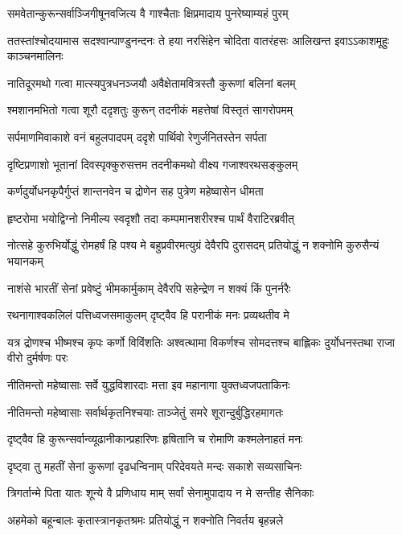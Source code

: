 \twolineshloka
{समवेतान्कुरून्सर्वाञ्जिगीषूनवजित्य वै}
{गाश्चैताः क्षिप्रमादाय पुनरेष्याम्यहं पुरम्}


\onelineshloka
{ततस्तांश्चोदयामास सदश्वान्पाण्डुनन्दनः}
\twolineshloka
{ते हया नरसिंहेन चोदिता वातरंहसः}
{आलिखन्त इवाऽऽकाशमूहुः काञ्चनमालिनः}


\twolineshloka
{नातिदूरमथो गत्वा मात्स्यपुत्रधनञ्जयौ}
{अवैक्षेतामवित्रस्तौ कुरूणां बलिनां बलम्}


\twolineshloka
{श्मशानमभितो गत्वा शूरौ ददृशतुः कुरून्}
{तदनीकं महत्तेषां विस्तृतं सागरोपमम्}


\twolineshloka
{सर्पमाणमिवाकाशे वनं बहुलपादपम्}
{ददृशे पार्थिवो रेणुर्जनितस्तेन सर्पता}


\twolineshloka
{दृष्टिप्रणाशो भूतानां दिवस्पृक्कुरुसत्तम}
{तदनीकमथो वीक्ष्य गजाश्वरथसङ्कुलम्}


\twolineshloka
{कर्णदुर्योधनकृपैर्गुप्तं शान्तनवेन च}
{द्रोणेन सह पुत्रेण महेष्वासेन धीमता}


\twolineshloka
{हृष्टरोमा भयोद्विग्नो निमील्य स्वदृशौ तदा}
{कम्पमानशरीरश्च पार्थं वैराटिरब्रवीत्}


\threelineshloka
{नोत्सहे कुरुभिर्योद्धुं रोमहर्षं हि पश्य मे}
{बहुप्रवीरमत्युग्रं देवैरपि दुरासदम्}
{प्रतियोद्धुं न शक्नोमि कुरुसैन्यं भयानकम्}


\twolineshloka
{नाशंसे भारतीं सेनां प्रवेष्टुं भीमकार्मुकाम्}
{देवैरपि सहेन्द्रेण न शक्यं किं पुनर्नरैः}


\twolineshloka
{रथनागाश्वकलिलं पत्तिध्वजसमाकुलम्}
{दृष्ट्वैव हि परानीकं मनः प्रव्यथतीव मे}


\threelineshloka
{यत्र द्रोणश्च भीष्मश्च कृपः कर्णो विविंशतिः}
{अश्वत्थामा विकर्णश्च सोमदत्तश्च बाह्लिकः}
{दुर्योधनस्तथा राजा वीरो दुर्मर्षणः परः}


\twolineshloka
{नीतिमन्तो महेष्वासाः सर्वे युद्धविशारदाः}
{मत्ता इव महानागा युक्तध्वजपताकिनः}


\twolineshloka
{नीतिमन्तो महेष्वासाः सर्वार्थकृतनिश्चयाः}
{ताञ्जेतुं समरे शूरान्दुर्बुद्धिरहमागतः}


\twolineshloka
{दृष्ट्वैव हि कुरून्सर्वान्व्यूढानीकान्प्रहारिणः}
{हृषितानि च रोमाणि कश्मलेनाहतं मनः}



\twolineshloka
{दृष्ट्वा तु महतीं सेनां कुरूणां दृढधन्विनाम्}
{परिदेवयते मन्दः सकाशे सव्यसाचिनः}


\twolineshloka
{त्रिगर्तान्मे पिता यातः शून्ये वै प्रणिधाय माम्}
{सर्वां सेनामुपादाय न मे सन्तीह सैनिकाः}


\twolineshloka
{अहमेको बहून्बालः कृतास्त्रानकृतश्रमः}
{प्रतियोद्धुं न शक्नोति निवर्तय बृहन्नले}


